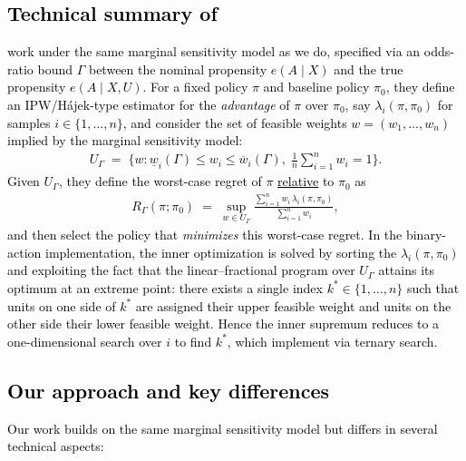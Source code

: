 \documentclass{article} %
\theoremstyle{plain}
\theoremstyle{definition}
\theoremstyle{remark}
\newcommand{\rebuttal}[1]{\textcolor{black}{#1}}
\begin{document}
\rebuttal{\subsection{Technical summary of \citet{Kallus.2018c,Kallus.2021d}}}
\rebuttal{\citet{Kallus.2018c,Kallus.2021d} work under the same marginal sensitivity model as we do, specified via an odds-ratio bound $\Gamma$ between the nominal propensity $e(A\mid X)$ and the true propensity $e(A\mid X,U)$. For a fixed policy $\pi$ and baseline policy $\pi_0$, they define an IPW/Hájek-type estimator for the \emph{advantage} of $\pi$ over $\pi_0$, say $\lambda_i(\pi,\pi_0)$ for samples $i \in \{1,\ldots, n\}$, and consider the set of feasible weights $w=(w_1,\dots,w_n)$ implied by the marginal sensitivity model:
\begin{align}
U_\Gamma \;=\;\big\{w: \underline{w}_i(\Gamma) \le w_i \le \overline{w}_i(\Gamma),\; \tfrac{1}{n}\sum_{i=1}^n w_i = 1 \big\}.
\end{align}
Given $U_\Gamma$, they define the worst-case regret of $\pi$ \underline{relative} to $\pi_0$ as
\begin{align}
R_\Gamma(\pi;\pi_0)
\;=\;
\sup_{w \in U_\Gamma}
\frac{\sum_{i=1}^n w_i\,\lambda_i(\pi,\pi_0)}{\sum_{i=1}^n w_i},
\end{align}
and then select the policy that \emph{minimizes} this worst-case regret. In the binary-action implementation, the inner optimization is solved by sorting the $\lambda_i(\pi,\pi_0)$ and exploiting the fact that the linear--fractional program over $U_\Gamma$ attains its optimum at an extreme point: there exists a single index $k^\ast \in \{1,\ldots,n\}$ such that units on one side of $k^\ast$ are assigned their upper feasible weight and units on the other side their lower feasible weight. Hence the inner supremum reduces to a one-dimensional search over $i$ to find $k^\ast$, which \citet{Kallus.2018c,Kallus.2021d} implement via ternary search.}

\rebuttal{\subsection{Our approach and key differences}}
\rebuttal{Our work builds on the same marginal sensitivity model but differs in several technical aspects:}
\end{document}
